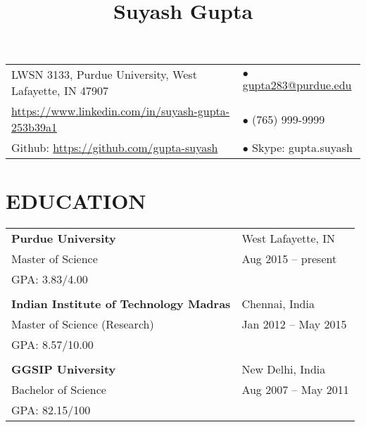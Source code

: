 \documentclass[10pt]{article}
\title{\vspace*{-2cm} \raggedright {\bf Suyash Gupta}}
\date{\vspace{-10ex}}	%
\begin{document}



\maketitle
{\hspace{-0.9cm}
\begin{tabular}{ll}
LWSN 3133, Purdue University, West Lafayette, IN 47907 	& $\bullet$ \href{mailto:gupta283@purdue.edu}{gupta283@purdue.edu} \\ 
\url{https://www.linkedin.com/in/suyash-gupta-253b39a1} & $\bullet$ (765) 999-9999 \\
Github: \url{https://github.com/gupta-suyash}  		& $\bullet$ Skype: gupta.suyash \\
\end{tabular}\newline
}

\section*{EDUCATION}
{\setlength{\tabcolsep}{40pt}
\hspace{-1.5cm}
\begin{tabular}{ll}
{\bf Purdue University} 			& West Lafayette, IN 	\\
Master of Science\footnotemark			& Aug 2015 -- present 	\\
GPA: 3.83/4.00					&			\\
						&			\\
{\bf Indian Institute of Technology Madras}	& Chennai, India	\\
Master of Science (Research)			& Jan 2012 -- May 2015 	\\
GPA: 8.57/10.00					&			\\
						&			\\
{\bf GGSIP University}				& New Delhi, India	\\ 
Bachelor of Science				& Aug 2007 -- May 2011	\\
GPA: 82.15/100					&			\\
\end{tabular}}
\end{document}
